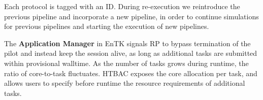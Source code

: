 








Each protocol is tagged with an ID. During re-execution we reintroduce
the previous pipeline and incorporate a new pipeline, in order to continue
simulations for previous pipelines and starting the execution of new pipelines. 


The \textbf{Application Manager} in EnTK signals RP to bypass termination of
the pilot and instead keep the session alive, as long as additional tasks are
submitted within provisional walltime. As the number of tasks grows during 
runtime, the ratio of core-to-task fluctuates. HTBAC exposes the core allocation 
per task, and allows users to specify before runtime the resource requirements 
of additional tasks.


